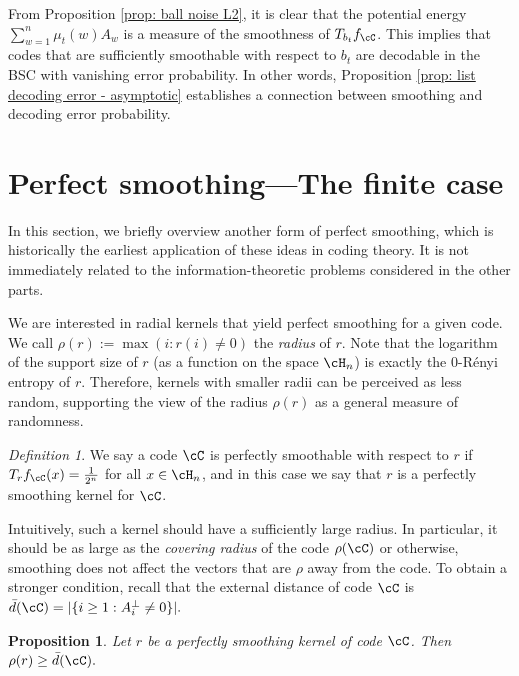 \documentclass{amsart}
\newtheorem{proposition}[theorem]{Proposition}
\theoremstyle{remark}
\newtheorem{definition}{Definition}[section]
\begin{document}
From Proposition \ref{prop: ball noise L2}, it is clear that the potential energy $\sum_{w=1}^{n}{\mu_t(w)}A_w$ is a measure of the smoothness of $T_{b_t}f_\cC$. This implies that codes that are sufficiently smoothable with respect to $b_t$ are decodable in the BSC with vanishing error probability. In other words, Proposition \ref{prop: list decoding error - asymptotic} establishes a connection between smoothing and decoding error probability. 



\section{Perfect smoothing---The finite case}\label{sec: Perfect smoothing -finite}
In this section, we briefly overview another form of perfect smoothing, which is historically the
earliest application of these ideas in coding theory. It is not immediately related to the information-theoretic problems considered in the other parts. 

We are interested in radial kernels that yield perfect smoothing for a given code. 
We call $\rho(r):=\max(i: r(i)\ne 0)$ the {\em radius} of $r$. Note that the logarithm of the support size of $r$ (as a function on the space $\cH_n$) is exactly the $0$-R{\'e}nyi entropy of $r$. Therefore, kernels with smaller radii can be perceived as less random, supporting the view of the radius $\rho(r)$ as a general measure of randomness.
\begin{definition}
  We say a code $\cC$ is perfectly smoothable with respect to $r$ if $T_rf_{\cC}(x) = \frac{1}{2^n}$ for all
  $x\in \cH_n$, and in this case we say that $r$ is a perfectly smoothing kernel for $\cC$.
\end{definition}


Intuitively, such a kernel should have a sufficiently large radius. In particular, it should be as large as the {\em covering radius} of the code $\rho(\cC)$ or otherwise, smoothing does not affect the vectors that are $\rho$ away from the code. To
obtain a stronger condition, recall that the external distance of code $\cC$ is 
    $
         \bar{d}(\cC) = |\{i\ge 1: A_i^\bot\ne0\}|.
    $
\begin{proposition}\label{prop: perfect smoothing requires spread kernels}
    Let $r$ be a perfectly smoothing kernel of code $\cC$. Then $ \rho(r) \geq \bar{d}(\cC).$
\end{proposition}
\end{document}
